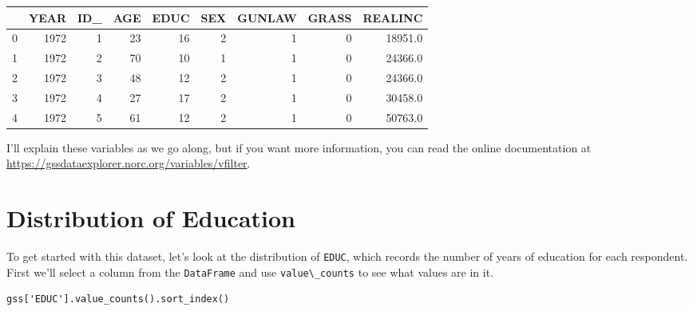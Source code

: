 \begin{tabular}{lrrrrrrrr}
\midrule
{} &  YEAR &  ID\_ &  AGE &  EDUC &  SEX &  GUNLAW &  GRASS &  REALINC \\
\midrule
0 &  1972 &    1 &   23 &    16 &    2 &       1 &      0 &  18951.0 \\
1 &  1972 &    2 &   70 &    10 &    1 &       1 &      0 &  24366.0 \\
2 &  1972 &    3 &   48 &    12 &    2 &       1 &      0 &  24366.0 \\
3 &  1972 &    4 &   27 &    17 &    2 &       1 &      0 &  30458.0 \\
4 &  1972 &    5 &   61 &    12 &    2 &       1 &      0 &  50763.0 \\
\midrule
\end{tabular}

I'll explain these variables as we go along, but if you want more
information, you can read the online documentation at
\url{https://gssdataexplorer.norc.org/variables/vfilter}.

\hypertarget{distribution-of-education}{%
\section{Distribution of Education}\label{distribution-of-education}}

To get started with this dataset, let's look at the distribution of
\passthrough{\lstinline!EDUC!}, which records the number of years of
education for each respondent. First we'll select a column from the
\passthrough{\lstinline!DataFrame!} and use
\passthrough{\lstinline!value\_counts!} to see what values are in it.

\begin{lstlisting}[]
gss['EDUC'].value_counts().sort_index()
\end{lstlisting}

